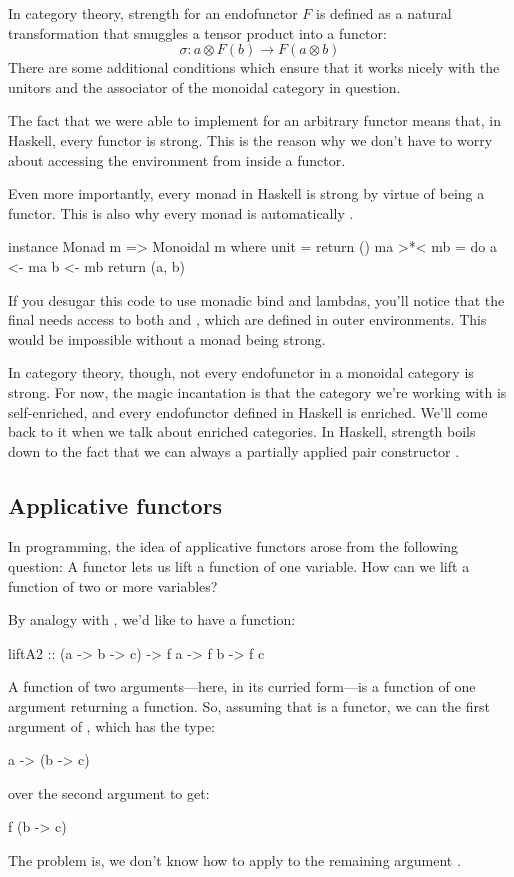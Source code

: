 \documentclass[DaoFP]{subfiles}
\begin{document}
In category theory, strength for an endofunctor $F$ is defined as a natural transformation that smuggles a tensor product into a functor:
\[ \sigma \colon a \otimes F(b) \to F (a \otimes b) \]
There are some additional conditions which ensure that it works nicely with the unitors and the associator of the monoidal category in question.

The fact that we were able to implement  for an arbitrary functor means that, in Haskell, every functor is strong. This is the reason why we don't have to worry about accessing the environment from inside a functor. 

Even more importantly, every monad in Haskell is strong by virtue of being a functor. This is also why every monad is automatically . 
\begin{haskell}
instance Monad m => Monoidal m where
  unit = return ()
  ma >*< mb = do
    a <- ma
    b <- mb
    return (a, b)
\end{haskell}
If you desugar this code to use monadic bind and lambdas, you'll notice that the final  needs access to both  and , which are defined in outer environments. This would be impossible without a monad being strong.

In category theory, though, not every endofunctor in a monoidal category is strong. For now, the magic incantation is that the category we're working with is self-enriched, and every endofunctor defined in Haskell is enriched. We'll come back to it when we talk about enriched categories. In Haskell, strength boils down to the fact that we can always  a partially applied pair constructor .

\subsection{Applicative functors}

In programming, the idea of applicative functors arose from the following question: A functor lets us lift a function of one variable. How can we lift a function of two or more variables? 

By analogy with , we'd like to have a function:
\begin{haskell}
liftA2 :: (a -> b -> c) -> f a -> f b -> f c
\end{haskell}

A function of two arguments---here, in its curried form---is a function of one argument returning a function. So, assuming that  is a functor, we can  the first argument of , which has the type:
\begin{haskell}
a -> (b -> c)
\end{haskell}
over the second argument  to get:
\begin{haskell}
f (b -> c)
\end{haskell}
The problem is, we don't know how to apply  to the remaining argument . 
\end{document}
